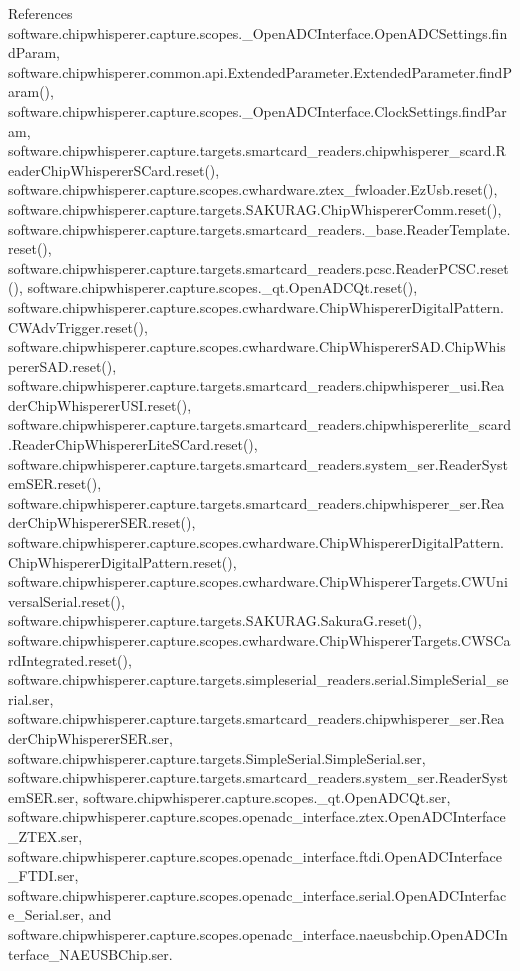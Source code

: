 References software.\+chipwhisperer.\+capture.\+scopes.\+\_\+\+Open\+A\+D\+C\+Interface.\+Open\+A\+D\+C\+Settings.\+find\+Param, software.\+chipwhisperer.\+common.\+api.\+Extended\+Parameter.\+Extended\+Parameter.\+find\+Param(), software.\+chipwhisperer.\+capture.\+scopes.\+\_\+\+Open\+A\+D\+C\+Interface.\+Clock\+Settings.\+find\+Param, software.\+chipwhisperer.\+capture.\+targets.\+smartcard\+\_\+readers.\+chipwhisperer\+\_\+scard.\+Reader\+Chip\+Whisperer\+S\+Card.\+reset(), software.\+chipwhisperer.\+capture.\+scopes.\+cwhardware.\+ztex\+\_\+fwloader.\+Ez\+Usb.\+reset(), software.\+chipwhisperer.\+capture.\+targets.\+S\+A\+K\+U\+R\+A\+G.\+Chip\+Whisperer\+Comm.\+reset(), software.\+chipwhisperer.\+capture.\+targets.\+smartcard\+\_\+readers.\+\_\+base.\+Reader\+Template.\+reset(), software.\+chipwhisperer.\+capture.\+targets.\+smartcard\+\_\+readers.\+pcsc.\+Reader\+P\+C\+S\+C.\+reset(), software.\+chipwhisperer.\+capture.\+scopes.\+\_\+qt.\+Open\+A\+D\+C\+Qt.\+reset(), software.\+chipwhisperer.\+capture.\+scopes.\+cwhardware.\+Chip\+Whisperer\+Digital\+Pattern.\+C\+W\+Adv\+Trigger.\+reset(), software.\+chipwhisperer.\+capture.\+scopes.\+cwhardware.\+Chip\+Whisperer\+S\+A\+D.\+Chip\+Whisperer\+S\+A\+D.\+reset(), software.\+chipwhisperer.\+capture.\+targets.\+smartcard\+\_\+readers.\+chipwhisperer\+\_\+usi.\+Reader\+Chip\+Whisperer\+U\+S\+I.\+reset(), software.\+chipwhisperer.\+capture.\+targets.\+smartcard\+\_\+readers.\+chipwhispererlite\+\_\+scard.\+Reader\+Chip\+Whisperer\+Lite\+S\+Card.\+reset(), software.\+chipwhisperer.\+capture.\+targets.\+smartcard\+\_\+readers.\+system\+\_\+ser.\+Reader\+System\+S\+E\+R.\+reset(), software.\+chipwhisperer.\+capture.\+targets.\+smartcard\+\_\+readers.\+chipwhisperer\+\_\+ser.\+Reader\+Chip\+Whisperer\+S\+E\+R.\+reset(), software.\+chipwhisperer.\+capture.\+scopes.\+cwhardware.\+Chip\+Whisperer\+Digital\+Pattern.\+Chip\+Whisperer\+Digital\+Pattern.\+reset(), software.\+chipwhisperer.\+capture.\+scopes.\+cwhardware.\+Chip\+Whisperer\+Targets.\+C\+W\+Universal\+Serial.\+reset(), software.\+chipwhisperer.\+capture.\+targets.\+S\+A\+K\+U\+R\+A\+G.\+Sakura\+G.\+reset(), software.\+chipwhisperer.\+capture.\+scopes.\+cwhardware.\+Chip\+Whisperer\+Targets.\+C\+W\+S\+Card\+Integrated.\+reset(), software.\+chipwhisperer.\+capture.\+targets.\+simpleserial\+\_\+readers.\+serial.\+Simple\+Serial\+\_\+serial.\+ser, software.\+chipwhisperer.\+capture.\+targets.\+smartcard\+\_\+readers.\+chipwhisperer\+\_\+ser.\+Reader\+Chip\+Whisperer\+S\+E\+R.\+ser, software.\+chipwhisperer.\+capture.\+targets.\+Simple\+Serial.\+Simple\+Serial.\+ser, software.\+chipwhisperer.\+capture.\+targets.\+smartcard\+\_\+readers.\+system\+\_\+ser.\+Reader\+System\+S\+E\+R.\+ser, software.\+chipwhisperer.\+capture.\+scopes.\+\_\+qt.\+Open\+A\+D\+C\+Qt.\+ser, software.\+chipwhisperer.\+capture.\+scopes.\+openadc\+\_\+interface.\+ztex.\+Open\+A\+D\+C\+Interface\+\_\+\+Z\+T\+E\+X.\+ser, software.\+chipwhisperer.\+capture.\+scopes.\+openadc\+\_\+interface.\+ftdi.\+Open\+A\+D\+C\+Interface\+\_\+\+F\+T\+D\+I.\+ser, software.\+chipwhisperer.\+capture.\+scopes.\+openadc\+\_\+interface.\+serial.\+Open\+A\+D\+C\+Interface\+\_\+\+Serial.\+ser, and software.\+chipwhisperer.\+capture.\+scopes.\+openadc\+\_\+interface.\+naeusbchip.\+Open\+A\+D\+C\+Interface\+\_\+\+N\+A\+E\+U\+S\+B\+Chip.\+ser.
